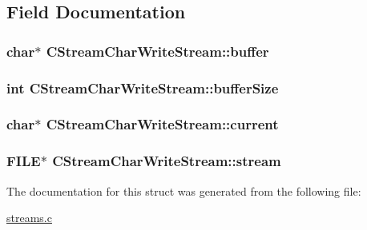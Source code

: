 \subsection{Field Documentation}
\hypertarget{structCStreamCharWriteStream_a6dde651f9319a133cc87ff1d00704e9d}{
\subsubsection[{buffer}]{\setlength{\rightskip}{0pt plus 5cm}char$\ast$ C\+Stream\+Char\+Write\+Stream\+::buffer}}\label{structCStreamCharWriteStream_a6dde651f9319a133cc87ff1d00704e9d}
\hypertarget{structCStreamCharWriteStream_a2bd0a0979c90381c931c05d516ff85cc}{
\subsubsection[{buffer\+Size}]{\setlength{\rightskip}{0pt plus 5cm}int C\+Stream\+Char\+Write\+Stream\+::buffer\+Size}}\label{structCStreamCharWriteStream_a2bd0a0979c90381c931c05d516ff85cc}
\hypertarget{structCStreamCharWriteStream_a0ea44c2c7b4f57056da34ca52023a09f}{
\subsubsection[{current}]{\setlength{\rightskip}{0pt plus 5cm}char$\ast$ C\+Stream\+Char\+Write\+Stream\+::current}}\label{structCStreamCharWriteStream_a0ea44c2c7b4f57056da34ca52023a09f}
\hypertarget{structCStreamCharWriteStream_a2b45d904fe67c3b764f559c2c575c895}{
\subsubsection[{stream}]{\setlength{\rightskip}{0pt plus 5cm}F\+I\+L\+E$\ast$ C\+Stream\+Char\+Write\+Stream\+::stream}}\label{structCStreamCharWriteStream_a2b45d904fe67c3b764f559c2c575c895}


The documentation for this struct was generated from the following file\+:\begin{DoxyCompactItemize}
\item 
\hyperlink{streams_8c}{streams.\+c}\end{DoxyCompactItemize}
